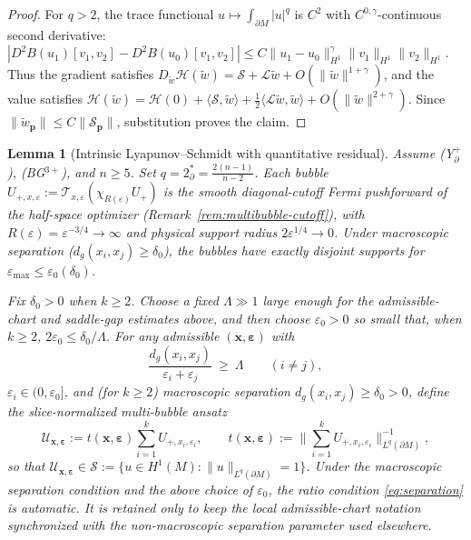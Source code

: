 \documentclass[11pt,reqno,a4paper]{amsart}
\numberwithin{equation}{section}
\theoremstyle{plain}
\newtheorem{lemma}[theorem]{Lemma}
\theoremstyle{remark}
\theoremstyle{plain}
\begin{document}
\begin{proof}
For $q>2$, the trace functional $u\mapsto\int_{\partial M}|u|^q$ is $C^2$
with $C^{0,\gamma}$-continuous second derivative:
$|D^2B(u_1)[v_1,v_2]-D^2B(u_0)[v_1,v_2]|
\le C\|u_1-u_0\|_{H^1}^\gamma\|v_1\|_{H^1}\|v_2\|_{H^1}$.
Thus the gradient satisfies
$D_{\tilde w}\mathscr H(\tilde w)
=\mathcal S+\mathcal L\tilde w+O(\|\tilde w\|^{1+\gamma})$,
and the value satisfies
$\mathscr H(\tilde w)=\mathscr H(0)+\langle\mathcal S,\tilde w\rangle
+\frac12\langle\mathcal L\tilde w,\tilde w\rangle
+O(\|\tilde w\|^{2+\gamma})$.
Since $\|\tilde w_{\mathbf p}\|\le C\|\mathcal S_{\mathbf p}\|$,
substitution proves the claim.
\end{proof}

\begin{lemma}[Intrinsic Lyapunov--Schmidt with quantitative residual]\label{lem:LS}
Assume \textup{(Y$^+_{\partial}$)}, \textup{(BG$^{3+}$)}, and $n\ge5$. Set
$q=2^*_{\partial}=\frac{2(n-1)}{n-2}$.
Each bubble
$U_{+,x,\varepsilon}:=\mathcal T_{x,\varepsilon}(\chi_{R(\varepsilon)}U_+)$ is the
\emph{smooth diagonal-cutoff} Fermi pushforward of the
half-space optimizer (Remark~\ref{rem:multibubble-cutoff}),
with $R(\varepsilon)=\varepsilon^{-3/4}\to\infty$ and
physical support radius $2\varepsilon^{1/4}\to0$.
Under macroscopic separation ($d_g(x_i,x_j)\ge\delta_0$),
the bubbles have exactly disjoint supports for $\varepsilon_{\max}\le\varepsilon_0(\delta_0)$.

Fix $\delta_0>0$ when $k\ge2$.  Choose a fixed $\Lambda\gg1$ large enough for the admissible-chart and
saddle-gap estimates above, and then choose $\varepsilon_0>0$ so small that, when $k\ge2$,
$2\varepsilon_0\le\delta_0/\Lambda$.
For any admissible $(\mathbf x,\boldsymbol\varepsilon)$ with
\begin{equation}\label{eq:separation}
\frac{d_g(x_i,x_j)}{\varepsilon_i+\varepsilon_j}\ \ge\ \Lambda\qquad (i\ne j),
\end{equation}
$\varepsilon_i\in(0,\varepsilon_0]$, and (for $k\ge2$) \emph{macroscopic separation}
$d_g(x_i,x_j)\ge\delta_0>0$, define the \emph{slice-normalized multi-bubble ansatz}
\[
\mathcal U_{\mathbf x,\boldsymbol\varepsilon}
:= t(\mathbf x,\boldsymbol\varepsilon)\sum_{i=1}^k U_{+,x_i,\varepsilon_i},
\qquad
t(\mathbf x,\boldsymbol\varepsilon)
:=\Big\|\sum_{i=1}^k U_{+,x_i,\varepsilon_i}\Big\|_{L^q(\partial M)}^{-1},
\]
so that $\mathcal U_{\mathbf x,\boldsymbol\varepsilon}\in\mathcal S:=\{u\in H^1(M):\|u\|_{L^q(\partial M)}=1\}$.
Under the macroscopic separation condition and the above choice of $\varepsilon_0$, the ratio
condition \eqref{eq:separation} is automatic.  It is retained only to keep the local
admissible-chart notation synchronized with the non-macroscopic separation parameter used elsewhere.


\end{lemma}
\end{document}
